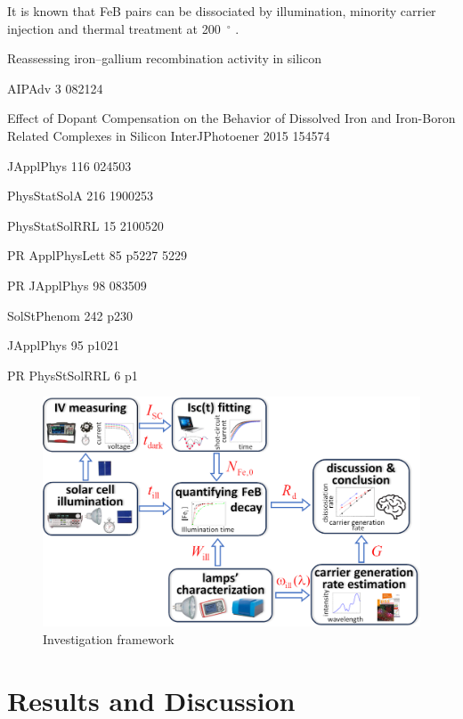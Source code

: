 \documentclass{WileyMSP-template}
\begin{document}
It is known that
FeB pairs can be dissociated by illumination, minority carrier injection and thermal treatment at 200~$^\circ$ \cite{FeBAssJAP2014}.


Reassessing iron–gallium recombination activity in silicon \cite{Le2024}

AIPAdv 3 082124 \cite{FeBStrongIll}

Effect of Dopant Compensation on the Behavior of Dissolved
Iron and Iron-Boron Related Complexes in Silicon InterJPhotoener 2015 154574 \cite{Zhu2015}

JApplPhys 116 024503 \cite{FeBAssJAP2014}

PhysStatSolA 216 1900253 \cite{FeBKin2019}

PhysStatSolRRL 15 2100520 \cite{Sun2021}

PR ApplPhysLett 85 p5227 5229 \cite{FeBLight2}

PR JApplPhys 98 083509 \cite{FeBJAP2005}

SolStPhenom 242 p230 \cite{lauer2016}

JApplPhys 95 p1021 \cite{Macdonald2004}

PR PhysStSolRRL 6 p1 \cite{FeMethod2012}


\begin{figure}
\centering
  \includegraphics[width=0.5\linewidth]{Fig1.png}
  \caption{Investigation framework}
  \label{fig1}
\end{figure}


%
%
%
%


\section{Results and Discussion}
\end{document}
